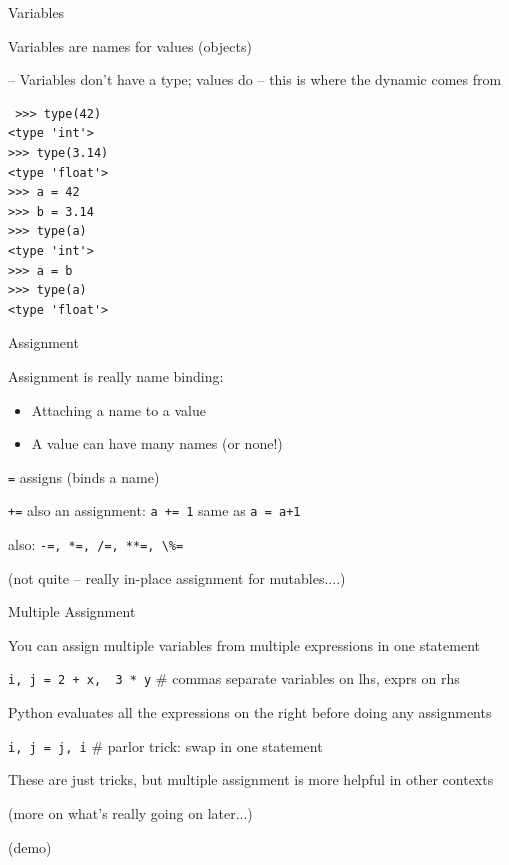 \documentclass{beamer}
\begin{document}
\begin{frame}[fragile]{Variables}

{\large Variables are names for values (objects)}

-- Variables don't have a type; values do -- 
this is where the dynamic comes from

\begin{verbatim}
￼>>> type(42)
<type 'int'>
>>> type(3.14)
<type 'float'>
>>> a = 42
>>> b = 3.14
>>> type(a)
<type 'int'>
>>> a = b
>>> type(a)
<type 'float'>
\end{verbatim}

\end{frame}

\begin{frame}[fragile]{Assignment}

{\Large Assignment is really name binding: }
\begin{itemize}
  \item Attaching a name to a value
  \item A value can have many names (or none!)
\end{itemize}

\vfill
{\large \verb|=| assigns (binds a name)}

\vfill
{\large \verb|+=| also an assignment: \verb|a += 1| same as \verb|a = a+1|}

\hspace{0.1in}also: \verb|-=, *=, /=, **=, \%=|

(not quite -- really in-place assignment for mutables....)

\end{frame}


\begin{frame}[fragile]{Multiple Assignment}

{\large You can assign multiple variables from multiple expressions in one statement}

\vfill
\verb|i, j = 2 + x,  3 * y| \# commas separate variables on lhs, exprs on rhs

\vfill
{\large Python evaluates all the expressions on the right before doing any assignments}

\vfill
\verb|i, j = j, i| \# parlor trick: swap in one statement

\vfill
\large{These are just tricks, but multiple assignment is more helpful in other contexts}

\vfill
(more on what's really going on later...)

\vfill
(demo)
\end{frame}
\end{document}
